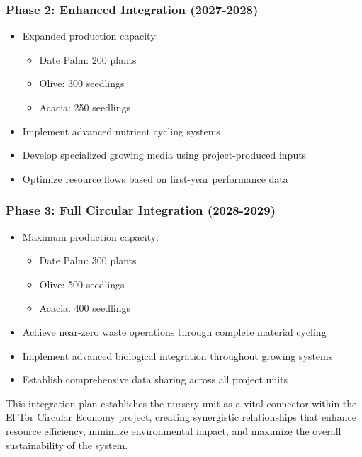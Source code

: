 \subsubsection{Phase 2: Enhanced Integration (2027-2028)}
\begin{itemize}
    \item Expanded production capacity:
    \begin{itemize}
        \item Date Palm: 200 plants
        \item Olive: 300 seedlings
        \item Acacia: 250 seedlings
    \end{itemize}
    \item Implement advanced nutrient cycling systems
    \item Develop specialized growing media using project-produced inputs
    \item Optimize resource flows based on first-year performance data
\end{itemize}

\subsubsection{Phase 3: Full Circular Integration (2028-2029)}
\begin{itemize}
    \item Maximum production capacity:
    \begin{itemize}
        \item Date Palm: 300 plants
        \item Olive: 500 seedlings
        \item Acacia: 400 seedlings
    \end{itemize}
    \item Achieve near-zero waste operations through complete material cycling
    \item Implement advanced biological integration throughout growing systems
    \item Establish comprehensive data sharing across all project units
\end{itemize}

This integration plan establishes the nursery unit as a vital connector within the El Tor Circular Economy project, creating synergistic relationships that enhance resource efficiency, minimize environmental impact, and maximize the overall sustainability of the system. 